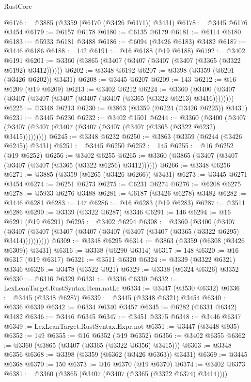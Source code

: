 \begin{lexlean}{RustCore}
\begin{coremodule}
@6176 := @3885 (@3359 (@6170 (@3426 @6171)) @3431)
@6178 := @3445 @6176 @3454
@6179 := @6157 @6178
@6180 := @6135 @6179
@6181 := @6114 @6180
@6183 := @5933 @6181 @3488
@6186 := @6094 (@3426 @6183) @3482
@6187 := @3446 @6186
@6188 := 142
@6191 := @16 @6188 (@19 @6188)
@6192 := @3402 @6191
@6201 := @3360 (@3865 (@3407 (@3407 (@3407 (@3407 (@3365 (@3322 @6192) @3412))))))
@6202 := @3348 @6192
@6207 := @3398 (@3359 (@6201 (@3426 @6202)) @3431)
@6208 := @3445 @6207
@6209 := 143
@6212 := @16 @6209 (@19 @6209)
@6213 := @3402 @6212
@6224 := @3360 (@3400 (@3407 (@3407 (@3407 (@3407 (@3407 (@3407 (@3365 (@3322 @6213) @3416))))))))
@6225 := @3348 @6213
@6230 := @3863 (@3359 (@6224 (@3426 @6225)) @3431)
@6231 := @3445 @6230
@6232 := @3402 @1501
@6244 := @3360
    (@3400 (@3407 (@3407 (@3407 (@3407 (@3407 (@3407 (@3407 (@3365 (@3322 @6232) @3415)))))))))
@6245 := @3348 @6232
@6250 := @3863 (@3359 (@6244 (@3426 @6245)) @3431)
@6251 := @3445 @6250
@6252 := 145
@6255 := @16 @6252 (@19 @6252)
@6256 := @3402 @6255
@6265 := @3360 (@3865 (@3407 (@3407 (@3407 (@3407 (@3365 (@3322 @6256) @3412))))))
@6266 := @3348 @6256
@6271 := @3885 (@3359 (@6265 (@3426 @6266)) @3431)
@6273 := @3445 @6271 @3454
@6274 := @6251 @6273
@6275 := @6231 @6274
@6276 := @6208 @6275
@6278 := @5933 @6276 @3488
@6281 := @6187 (@3426 @6278) @3482
@6282 := @3446 @6281
@6283 := 147
@6286 := @16 @6283 (@19 @6283)
@6287 := @3511 @6286
@6290 := @3339 (@3322 @6287) @3346
@6291 := 146
@6294 := @16 @6291 (@19 @6291)
@6295 := @3402 @6294
@6308 := @3360
    (@3400
      (@3407 (@3407 (@3407 (@3407 (@3407 (@3407 (@3407 (@3407 (@3365 (@3322 @6295) @3414))))))))))
@6309 := @3348 @6295
@6314 := @3863 (@3359 (@6308 (@3426 @6309)) @3431)
@6316 := @3338 (@6290 @6314)
@6317 := 148
@6320 := @16 @6317 (@19 @6317)
@6321 := @3511 @6320
@6324 := @3339 (@3322 @6321) @3346
@6326 := @3478 (@3522 @921)
@6329 := @3338 (@6324 @6326) @3352
@6330 := @6316 @6329
@6331 := @3336 @6330
@6332 := LexLeanTarget.RustSyntax.Item.natLe
@6334 := @3447 (@3530 @6332)
@6336 := @3445 (@3348 @6287)
@6339 := @3445 (@3348 @6321) @3454
@6340 := @6336 @6339
@6342 := @6334 @6340 @3457
@6345 := @6282 (@6331 @6342) @3482
@6346 := @3446 @6345
@6347 := @3451 @3375
@6348 := @3446 @6347
@6349 := LexLeanTarget.RustSyntax.Expr.not
@6351 := @3447 (@3448 @935)
@6352 := 149
@6355 := @16 @6352 (@19 @6352)
@6356 := @3402 @6355
@6362 := @3360 (@3865 (@3407 (@3365 (@3322 @6356) @3415)))
@6363 := @3348 @6356
@6368 := @3398 (@3359 (@6362 (@3426 @6363)) @3431)
@6369 := @3445 @6368
@6370 := 150
@6373 := @16 @6370 (@19 @6370)
@6374 := @3402 @6373
@6381 := @3360 (@3865 (@3407 (@3407 (@3365 (@3322 @6374) @3414))))

\end{coremodule}
\end{lexlean}
